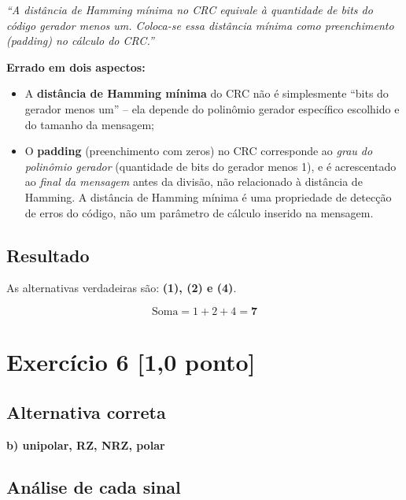 \documentclass[12pt,a4paper]{article}
\begin{document}
\textit{``A distância de Hamming mínima no CRC equivale à quantidade de bits do código gerador menos um. Coloca-se essa distância mínima como preenchimento (padding) no cálculo do CRC.''}

\textbf{Errado em dois aspectos:}
\begin{itemize}
    \item A \textbf{distância de Hamming mínima} do CRC não é simplesmente ``bits do gerador menos um'' -- ela depende do polinômio gerador específico escolhido e do tamanho da mensagem;
    \item O \textbf{padding} (preenchimento com zeros) no CRC corresponde ao \textit{grau do polinômio gerador} (quantidade de bits do gerador menos 1), e é acrescentado ao \textit{final da mensagem} antes da divisão, não relacionado à distância de Hamming. A distância de Hamming mínima é uma propriedade de detecção de erros do código, não um parâmetro de cálculo inserido na mensagem.
\end{itemize}

\subsection*{Resultado}

As alternativas verdadeiras são: \textbf{(1), (2) e (4)}.

\[
\boxed{\text{Soma} = 1 + 2 + 4 = \mathbf{7}}
\]

\vspace{1em}

\section*{Exercício 6 \hfill \normalfont\small[1,0 ponto]}

\subsection*{Alternativa correta}

\begin{center}
\large\textbf{b) unipolar, RZ, NRZ, polar}
\end{center}

\subsection*{Análise de cada sinal}
\end{document}
